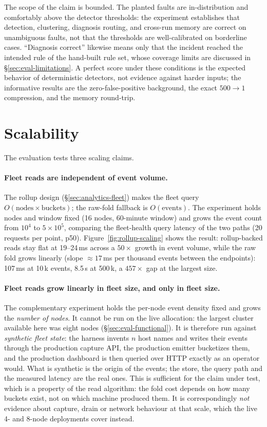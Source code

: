 The scope of the claim is bounded. The planted faults are
in-distribution and comfortably above the detector thresholds: the
experiment establishes that detection, clustering, diagnosis routing,
and cross-run memory are correct on unambiguous faults, not that the
thresholds are well-calibrated on borderline cases. ``Diagnosis
correct'' likewise means only that the incident reached the intended
rule of the hand-built rule set, whose coverage limits are discussed in
\S\ref{sec:eval-limitations}. A perfect score under these conditions is
the expected behavior of deterministic detectors, not evidence against
harder inputs; the informative results are the zero-false-positive
background, the exact $500{\to}1$ compression, and the memory
round-trip.

\section{Scalability}
\label{sec:eval-scalability}

The evaluation tests three scaling claims.

\paragraph{Fleet reads are independent of event volume.} The rollup
design (\S\ref{sec:analytics-fleet}) makes the fleet query
$O(\text{nodes} \times \text{buckets})$; the raw-fold fallback is
$O(\text{events})$. The experiment holds nodes and window fixed (16
nodes, 60-minute window) and grows the event count from $10^4$ to
$5 \times 10^5$, comparing the fleet-health query latency of the two
paths (20 requests per point, p50). Figure~\ref{fig:rollup-scaling}
shows the result: rollup-backed reads stay flat at 19--24\,ms across a
$50\times$ growth in event volume, while the raw fold grows linearly
(slope ${\approx}17$\,ms per thousand events between the endpoints):
107\,ms at 10\,k events, 8.5\,s at 500\,k, a $457\times$ gap at the
largest size.

\paragraph{Fleet reads grow linearly in fleet size, and only in fleet
size.} The complementary experiment holds the per-node event density fixed
and grows the \emph{number of nodes}. It cannot be run on the live
allocation: the largest cluster available here was eight nodes
(\S\ref{sec:eval-functional}). It is therefore run against
\emph{synthetic fleet state}: the harness invents $n$ host names and
writes their events through the production capture API, the production
emitter bucketizes them, and the production dashboard is then queried over
HTTP exactly as an operator would. What is synthetic is the origin of the
events; the store, the query path and the measured latency are the real
ones. This is sufficient for the claim under test, which is a property of
the read algorithm: the fold cost depends on how many buckets exist, not on
which machine produced them. It is correspondingly \emph{not} evidence
about capture, drain or network behaviour at that scale, which the live
4- and 8-node deployments cover instead.

